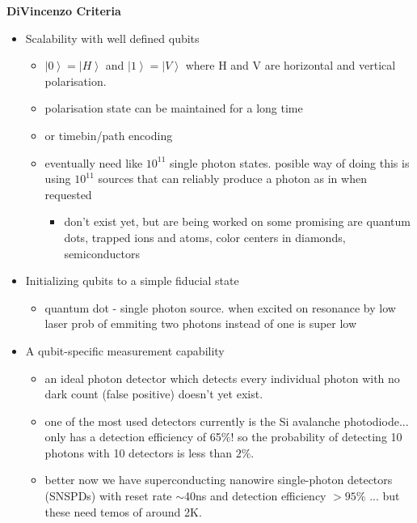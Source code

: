 \vspace{1em}
{\bf DiVincenzo Criteria} \cite{bergou_quantum_2021}
\begin{itemize}
    \item Scalability with well defined qubits
    
    \begin{itemize}
        \item $\left\vert 0 \right\rangle = \left\vert H\right\rangle $ and $\left\vert 1 \right\rangle = \left\vert V\right\rangle $ where H and V are horizontal and vertical polarisation.  
        \item polarisation state can be maintained for a long time
        \item or timebin/path encoding \cite{obrien_optical_2007}

        \item eventually need like $10^11$ single photon states. posible way of doing this is using $10^11$ sources that can reliably produce a photon as in when requested
        \begin{itemize}
            \item don't exist yet, but are being worked on some promising are quantum dots, trapped ions and atoms, color centers in diamonds, semiconductors \cite{slussarenko_photonic_2019}
        \end{itemize}
    \end{itemize}

    \item Initializing qubits to a simple fiducial state
    \begin{itemize}
        \item quantum dot - single photon source. when excited on resonance by low laser prob of emmiting two photons instead of one is super low \cite{santori_indistinguishable_2002}
    \end{itemize}

    \item  A qubit-specific measurement capability
    \begin{itemize}
        \item an ideal photon detector which detects every individual photon with no dark count (false positive) doesn't yet exist. 
        \item one of the most used detectors currently is the Si avalanche photodiode... only has a detection efficiency of 65$\%$! so the probability of detecting 10 photons with 10 detectors is less than $2\%$. \cite{slussarenko_photonic_2019}
        \item better now we have superconducting nanowire single-photon detectors (SNSPDs) with reset rate $\sim$40ns and detection efficiency $>95\%$ ... but these need temos of around 2K. \cite{santori_indistinguishable_2002}
        

\end{itemize}
\end{itemize}
